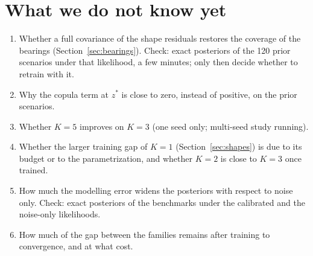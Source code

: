 \documentclass[11pt]{article}
\begin{document}
\section{What we do not know yet}\label{sec:open}
\begin{enumerate}
\item Whether a full covariance of the shape residuals restores the coverage of the bearings (Section~\ref{sec:bearings}).
Check: exact posteriors of the 120 prior scenarios under that likelihood, a few minutes; only then decide whether to
retrain with it.
\item Why the copula term at $z^*$ is close to zero, instead of positive, on the prior scenarios.
\item Whether $K=5$ improves on $K=3$ (one seed only; multi-seed study running).
\item Whether the larger training gap of $K=1$ (Section~\ref{sec:shapes}) is due to its budget or to the parametrization,
and whether $K=2$ is close to $K=3$ once trained.
\item How much the modelling error widens the posteriors with respect to noise only. Check: exact posteriors of the
benchmarks under the calibrated and the noise-only likelihoods.
\item How much of the gap between the families remains after training to convergence, and at what cost.
\end{enumerate}
\end{document}
